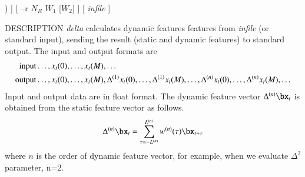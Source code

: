 \begin{synopsis}
	\item [delta] [ --m $M$ ] [ --l $L$ ] [ --t $T$ ] 
		[ --d ($fn$ $|$ $d_0$ [$d_1$ $\dots$]) ]
		[ --r $N_R$ $W_1$ [$W_2$] ]  [ {\em infile} ] 
\end{synopsis}

\begin{qsection}{DESCRIPTION}
	{\em delta} calculates dynamic features features from {\em infile} (or standard
	input), sending the result (static and dynamic features) to standard output. 
	The input and output formats are
    \begin{align}
	\mathrm{input}  & \dots, x_t(0), \dots, x_t(M), \dots \notag \\
	\mathrm{output} & \dots, x_t(0), \dots, x_t(M), \Delta^{(1)} x_t(0), \dots, \Delta^{(1)} x_t(M), \dots,
	\Delta^{(n)} x_t(0), \dots, \Delta^{(n)} x_t(M), \dots \notag
 \end{align}
Input and output data are in float format.
The dynamic feature vector $\Delta^{(n)}\bx_t$ is
obtained from the static feature vector as follows.
 \begin{displaymath}
	\Delta^{(n)}\bx_t 
	= \sum_{\tau=-L^{(n)}}^{L^{(n)}} w^{(n)}(\tau)\bx_{t+\tau}
 \end{displaymath}
where $n$ is the order of dynamic feature vector, for
example, when we evaluate $\Delta^2$ parameter, n=2.
\end{qsection}

